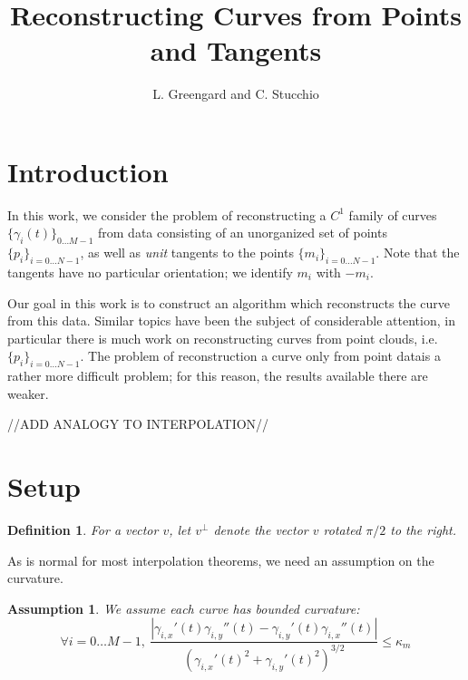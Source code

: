\documentclass{article}
\newtheorem{definition}[cntr]{Definition}
\newtheorem{assumption}{Assumption}
\numberwithin{cntr}{section}
\newcommand{\abs}[1]{\left| #1 \right|}%
\newcommand{\Oto}[1]{{0 \ldots #1-1}}
\newcommand{\OtoN}{{0 \ldots N-1}}
\newcommand{\pointData}{{ \{ p_{i} \}_{i=\OtoN} }}
\newcommand{\tanData}{{ \{ m_{i} \}_{i=\OtoN} }}
\newcommand{\curveSet}{{ \{ \gamma_i(t) \}_{\Oto{M}}}}
\newcommand{\kmax}{{\kappa_{m}}}
\begin{document}
\title{Reconstructing Curves from Points and Tangents}

\author{L. Greengard and C. Stucchio}

\maketitle

\section{Introduction}

In this work, we consider the problem of reconstructing a $C^{1}$ family of curves $\curveSet$ from data consisting of an unorganized set of points $\pointData$, as well as \emph{unit} tangents to the points $\tanData$. Note that the tangents have no particular orientation; we identify $m_{i}$ with $-m_{i}$.

Our goal in this work is to construct an algorithm which reconstructs the curve from this data. Similar topics have been the subject of considerable attention, in particular there is much work\cite{amenta98crust,amenta98new,dey99curve,hoppe92surface,amenta02simple, dey01reconstructing} on reconstructing curves from point clouds, i.e. $\pointData$. The problem of reconstruction a curve only from point datais a rather more difficult problem; for this reason, the results available there are weaker.

//ADD ANALOGY TO INTERPOLATION//

\section{Setup}

\begin{definition}
  For a vector $v$, let $v^{\perp}$ denote the vector $v$ rotated $\pi/2$ to the right.
\end{definition}

As is normal for most interpolation theorems, we need an assumption on the curvature.

\begin{assumption}
  We assume each curve has bounded curvature:
  \begin{equation}
    \label{eq:curvatureAssumption}
    \forall i = \Oto{M}, ~ \frac{
      \abs{\gamma_{i,x}'(t) \gamma_{i,y}''(t) - \gamma_{i,y}'(t) \gamma_{i,x}''(t)}
    } {
      (\gamma_{i,x}'(t)^{2}+\gamma_{i,y}'(t)^{2})^{3/2}
    } \leq \kmax
  \end{equation}
\end{assumption}
\end{document}

